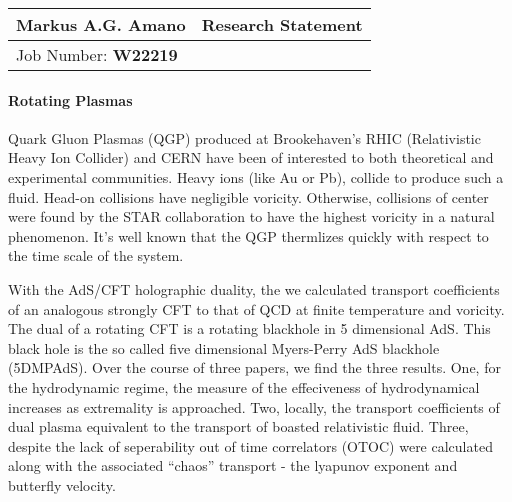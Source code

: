 \documentclass[fontsize=12pt]{article}
\begin{document}
\begin{center}
  \begin{tabularx}{\textwidth} { 
      >{\raggedright\arraybackslash}X 
    >{\raggedleft\arraybackslash}X  }
    \huge Markus A.G. Amano & Research Statement\\
    \hline
    Job Number: \textbf{W22219} & \\
  \end{tabularx}
\end{center}


\paragraph{Rotating Plasmas}

Quark Gluon Plasmas (QGP) produced at Brookehaven's RHIC (Relativistic Heavy Ion Collider) and CERN have been of interested to both theoretical and experimental communities.
Heavy ions (like Au or Pb), collide to produce such a fluid.
Head-on collisions have negligible voricity.
Otherwise, collisions of center were found by the STAR collaboration to have the highest voricity in a natural phenomenon.
It's well known that the QGP thermlizes quickly with respect to the time scale of the system.

With the AdS/CFT holographic duality, the we calculated transport coefficients of an analogous strongly CFT to that of QCD at finite temperature and voricity.
The dual of a rotating CFT is a rotating blackhole in 5 dimensional AdS. 
This black hole is the so called five dimensional Myers-Perry AdS blackhole (5DMPAdS).
Over the course of three papers, we find the three results. 
One, for the hydrodynamic regime, the measure of the effeciveness of hydrodynamical increases as extremality is approached.
Two, locally, the transport coefficients of dual plasma equivalent to the transport of boasted relativistic fluid.
Three, despite the lack of seperability out of time correlators (OTOC) were calculated along with the associated ``chaos'' transport - the lyapunov exponent and butterfly velocity.
\end{document}
